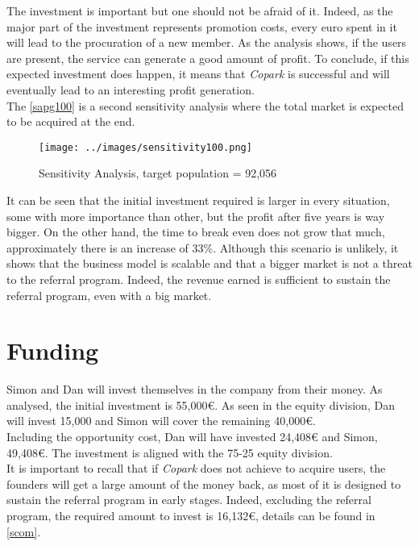 \documentclass[12pt,a4paper,oneside]{book}
\newcommand{\bp}{\textit{Copark}}
\begin{document}
The investment is important but one should not be afraid of it. Indeed, as the major part of the investment represents promotion costs, every euro spent in it will lead to the procuration of a new member. As the analysis shows, if the users are present, the service can generate a good amount of profit. To conclude, if this expected investment does happen, it means that \bp{} is successful and will eventually lead to an interesting profit generation.\\

The \autoref{sapg100} is a second sensitivity analysis where the total market is expected to be acquired at the end.\\

\begin{figure}[h]
\centering
\caption{Sensitivity Analysis, target population = 92,056}
\label{sapg100}
\texttt{[image: ../images/sensitivity100.png]}
\end{figure}

It can be seen that the initial investment required is larger in every situation, some with more importance than other, but the profit after five years is way bigger. On the other hand, the time to break even does not grow that much, approximately there is an increase of 33\%. Although this scenario is unlikely, it shows that the business model is scalable and that a bigger market is not a threat to the referral program. Indeed, the revenue earned is sufficient to sustain the referral program, even with a big market.

\section{Funding}
Simon and Dan will invest themselves in the company from their money. As analysed, the initial investment is 55,000\euro{}. As seen in the equity division, Dan will invest 15,000 and Simon will cover the remaining 40,000\euro{}.\\

Including the opportunity cost, Dan will have invested 24,408\euro{} and Simon, 49,408\euro{}. The investment is aligned with the 75-25 equity division.\\

It is important to recall that if \bp{} does not achieve to acquire users, the founders will get a large amount of the money back, as most of it is designed to sustain the referral program in early stages. Indeed, excluding the referral program, the required amount to invest is 16,132\euro{}, details can be found in \autoref{scom}.
\end{document}
